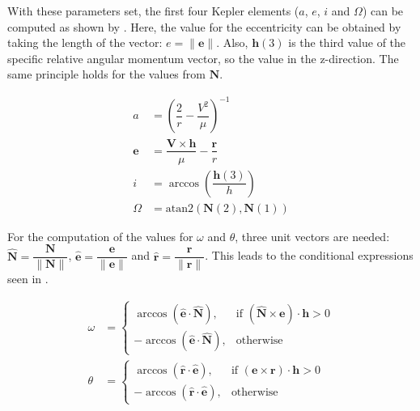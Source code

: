 \noindent
With these parameters set, the first four Kepler elements ($a$, $e$, $i$ and $\Omega$) can be computed as shown by . Here, the value for the eccentricity can be obtained by taking the length of the vector: $e=\|\mathbf{e}\|$. Also, $\mathbf{h}(3)$ is the third value of the specific relative angular momentum vector, so the value in the z-direction. The same principle holds for the values from $\mathbf{N}$.

\begin{equation}\label{eq:carttokep4}
\begin{split}
a&=\left(\dfrac{2}{r}-\dfrac{V^{2}}{\mu}\right)^{-1}\\
\mathbf{e}&=\dfrac{\mathbf{V} \times \mathbf{h}}{\mu}-\dfrac{\mathbf{r}}{r}\\
i&=\arccos\left(\dfrac{\mathbf{h}(3)}{h}\right)\\
\Omega&=\text{atan}2\left(\mathbf{N}(2),\mathbf{N}(1)\right)
\end{split}
\end{equation}

\noindent
For the computation of the values for $\omega$ and $\theta$, three unit vectors are needed: $\hat{\mathbf{N}}=\dfrac{\mathbf{N}}{\|\mathbf{N}\|}$, $\hat{\mathbf{e}}=\dfrac{\mathbf{e}}{\|\mathbf{e}\|}$ and $\hat{\mathbf{r}}=\dfrac{\mathbf{r}}{\|\mathbf{r}\|}$. This leads to the conditional expressions seen in . 



\begin{equation}\label{eq:omegathetacond}
\begin{split}
\omega&=\begin{cases}
\arccos\left(\hat{\mathbf{e}}\cdot\hat{\mathbf{N}}\right), & \text{if } \left(\hat{\mathbf{N}} \times \mathbf{e}\right) \cdot \mathbf{h}>0\\
-\arccos\left(\hat{\mathbf{e}}\cdot\hat{\mathbf{N}}\right), & \text{otherwise}
\end{cases}\\
\theta&=\begin{cases}
\arccos\left(\hat{\mathbf{r}}\cdot\hat{\mathbf{e}}\right), & \text{if } \left(\mathbf{e} \times \mathbf{r}\right) \cdot \mathbf{h}>0\\
-\arccos\left(\hat{\mathbf{r}}\cdot\hat{\mathbf{e}}\right), & \text{otherwise}
\end{cases}
\end{split}
\end{equation}

